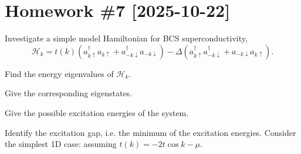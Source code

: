
\section*{Homework \#7 [2025-10-22]}

\begin{problem}
  Investigate a simple model Hamiltonian for BCS superconductivity,
  \[
    \mathcal H_k = t(k) (
      a_{k\uparrow}^\dagger a_{k\uparrow} +
      a_{-k\downarrow}^\dagger a_{-k\downarrow}) - \Delta(
      a_{k\uparrow}^\dagger a_{-k\downarrow}^\dagger +
      a_{-k\downarrow} a_{k\uparrow}).
  \]
  \begin{enumext}
    \item Find the energy eigenvalues of $\mathcal H_k$.
    \item Give the corresponding eigenstates.
    \item Give the possible excitation energies of the system.
    \item Identify the excitation gap, i.e. the minimum of the excitation
    energies. Consider the simplest 1D case: assuming $t(k) = -2t\cos k - \mu$.
  \end{enumext}
\end{problem}
